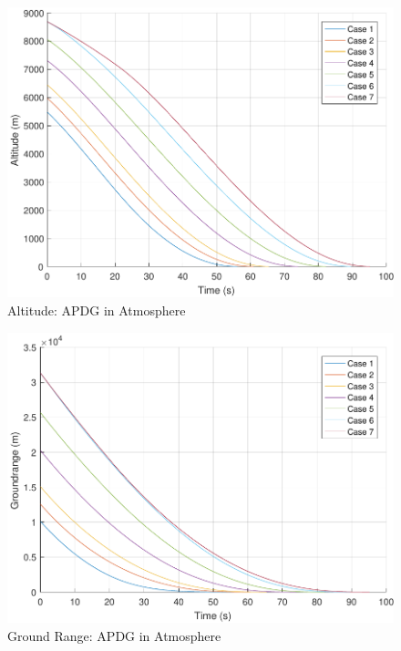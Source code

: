 \begin{figure}[H]
	\centering
	\begin{minipage}{4.5 in}
		\includegraphics[width=\linewidth]{Figures/altpowatmo.pdf}
		\caption{Altitude: APDG in Atmosphere \label{fig:altpowatmo} }
	\end{minipage}
\end{figure}

\begin{figure}[H]
	\centering
	\begin{minipage}{4.5 in}
		\includegraphics[width=\linewidth]{Figures/rngpowatmo.pdf}
		\caption{Ground Range: APDG in Atmosphere \label{fig:rngpowatmo} }
	\end{minipage}
\end{figure}

